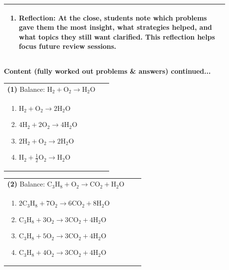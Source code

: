 \documentclass{article}
\begin{document}
{\begin{tabular}{|p{0.9\linewidth}|}
\begin{enumerate}
    \item \textbf{Reflection:} At the close, students note which problems gave them the most insight, what strategies helped, and what topics they still want clarified. This reflection helps focus future review sessions.
\end{enumerate}\\
\hline
\end{tabular}
\newpage
\noindent
{\large\textbf{Content (fully worked out problems \& answers) continued...}}\\[0.2em]
\vspace{0.2cm}
\noindent \begin{tabular}{|p{0.9\linewidth}|}
\hline
\vspace{0.2cm}
\textbf{(1)} Balance: \(\mathrm{H_2 + O_2 \rightarrow H_2O}\)\\
\begin{minipage}[t]{0.85\linewidth}
\begin{enumerate}[label=\alph*.]
   \item \(\mathrm{H_2 + O_2 \rightarrow 2H_2O}\)
   \item \(\mathrm{4H_2 + 2O_2 \rightarrow 4H_2O}\)
   \item \(\mathrm{2H_2 + O_2 \rightarrow 2H_2O}\)
   \item \(\mathrm{H_2 + \tfrac{1}{2}O_2 \rightarrow H_2O}\)
\end{enumerate}
\end{minipage}\\
\hline
\end{tabular}

\vspace{0.2cm}
\noindent \begin{tabular}{|p{0.9\linewidth}|}
\hline
\vspace{0.2cm}
\textbf{(2)} Balance: \(\mathrm{C_3H_8 + O_2 \rightarrow CO_2 + H_2O}\)\\
\begin{minipage}[t]{0.85\linewidth}
\begin{enumerate}[label=\alph*.]
   \item \(\mathrm{2C_3H_8 + 7O_2 \rightarrow 6CO_2 + 8H_2O}\)
   \item \(\mathrm{C_3H_8 + 3O_2 \rightarrow 3CO_2 + 4H_2O}\)
   \item \(\mathrm{C_3H_8 + 5O_2 \rightarrow 3CO_2 + 4H_2O}\)
   \item \(\mathrm{C_3H_8 + 4O_2 \rightarrow 3CO_2 + 4H_2O}\)
\end{enumerate}
\end{minipage}\\
\hline
\end{tabular}

}
\end{document}

